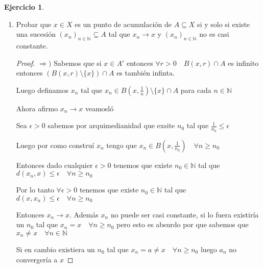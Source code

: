 \documentclass[11pt]{report}
\newcommand{\N}{\mathbb{N}}
\newcommand{\Ra}{\Rightarrow}
\newcommand{\ra}{\rightarrow}
\theoremstyle{definition}
\newtheorem*{remark}{Observación}
\newtheorem{ej}{Ejercicio}
\begin{document}
\begin{ej}
\begin{enumerate}
\begin{enumerate}
\begin{proof}
\begin{remark}
\begin{proof}
			Luego $x \in A'$
		\end{proof}
	\end{remark}

	  \end{proof}
      \end{enumerate}
    \item Probar que $x \in X$ es un punto de acumulación de $A \subseteq X$ si y solo si existe una sucesión $(x_{n})_{n \in \N} \subseteq A$ tal que $x_{n} \ra x$ y $(x_{n})_{n \in \N}$ no es casi constante. 
      \begin{proof}
    $\Ra )$ Sabemos que si $x \in A'$ entonces $\forall r>0 \quad B(x,r) \cap A$ es infinito entonces $(B(x,r)\setminus \{x\}) \cap A$ es también infinta. 

      Luego definamos $x_{n}$ tal que $x_{n} \in B(x,\frac{1}{n}) \setminus \{x\} \cap A$ para cada $n \in \N$

Ahora afirmo $x_{n} \ra x$ veamosló

Sea $\epsilon > 0$ sabemos por arquimedianidad que exsite $n_0$ tal que $\frac{1}{n_0} \leq \epsilon$

Luego por como construí $x_n$ tengo que $x_n \in B(x,\frac{1}{n_0}) \quad \forall n \geq n_0$

Entonces dado cualquier $\epsilon > 0$ tenemos que existe $n_0 \in \N$ tal que $d(x_n ,x ) \leq \epsilon \quad \forall n \geq n_0$

Por lo tanto $ \forall \epsilon > 0$ tenemos que existe $n_0 \in \N$ tal que $ d(x,x_n) \leq \epsilon \quad \forall n \geq n_0 $ 

Entonces $x_n \ra x$. Además $x_{n}$ no puede ser casi constante, si lo fuera existiría un $n_{0}$ tal que  $x_{n} = x \quad \forall n \geq n_{0}$ pero esto es absurdo por que sabemos que $x_n \neq x \quad \forall n \in \N$  
     
Si en cambio existiera un $n_0$ tal que $x_n = a \neq x \quad \forall n \geq n_0$ luego $a_n$ no convergería a $x$

    \end{proof}
  \end{enumerate}
\end{ej}
\end{document}
